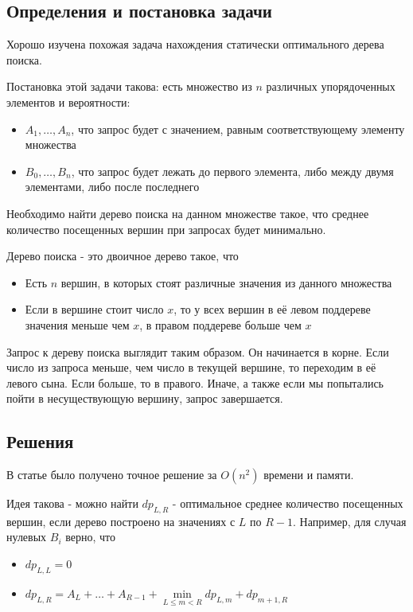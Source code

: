 \subsection{Определения и постановка задачи}

Хорошо изучена похожая задача нахождения статически оптимального дерева поиска.

Постановка этой задачи такова: есть множество из $n$ различных упорядоченных элементов и вероятности:

\begin{itemize}
    \item $A_1,\dots,A_n$, что запрос будет с значением, равным соответствующему элементу множества
    \item $B_0,\dots,B_n$, что запрос будет лежать до первого элемента, либо между двумя элементами, либо после последнего
\end{itemize}
  
Необходимо найти дерево поиска на данном множестве такое, что среднее количество посещенных вершин при запросах будет минимально.

Дерево поиска - это двоичное дерево такое, что

\begin{itemize}
    \item Есть $n$ вершин, в которых стоят различные значения из данного множества
    \item Если в вершине стоит число $x$, то у всех вершин в её левом поддереве значения меньше чем $x$, в правом поддереве больше чем $x$
\end{itemize}
  
Запрос к дереву поиска выглядит таким образом. Он начинается в корне. Если число из запроса меньше, чем число в текущей вершине, то переходим в её левого сына. Если больше, то в правого. Иначе, а также если мы попытались пойти в несуществующую вершину, запрос завершается.

\subsection{Решения}

В статье \cite{knuth71} было получено точное решение за $O(n^2)$ времени и памяти.

Идея такова - можно найти $dp_{L, R}$ - оптимальное среднее количество посещенных вершин, если дерево построено на значениях с $L$ по $R - 1$. Например, для случая нулевых $B_i$ верно, что

\begin{itemize}
    \item $dp_{L, L} = 0$
    \item $dp_{L, R} = A_L + \dots + A_{R - 1} + \min \limits_{L \leqslant m < R} {dp_{L, m} + dp_{m + 1, R}}$
\end{itemize}
  
